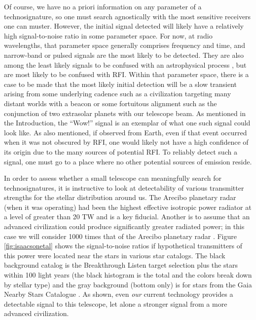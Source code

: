 Of course, we have no a priori information on any parameter of a technosignature, so one must search agnostically with the most sensitive receivers one can muster.  However, the initial signal detected will likely have a relatively high signal-to-noise ratio in some parameter space. For now, at radio wavelengths, that parameter space generally comprises frequency and time, and narrow-band or pulsed signals are the most likely to be detected.  They are also among the least likely signals to be confused with an astrophysical process \citep{Hippke_2017}, but are most likely to be confused with RFI. Within that parameter space, there is a case to be made that the most likely initial detection will be a slow transient arising from some underlying cadence such as a civilization targeting many distant worlds with a beacon or some fortuitous alignment such as the conjunction of two extrasolar planets with our telescope beam.  As mentioned in the Introduction, the ``Wow!'' signal is an exemplar of what one such signal could look like.  As also mentioned, if observed from Earth, even if that event occurred when it was not obscured by RFI, one would likely not have a high confidence of its origin due to the many sources of potential RFI. To reliably detect such a signal, one must go to a place where no other potential sources of emission reside.

In order to assess whether a small telescope can meaningfully search for technosignatures, it is instructive to look at detectability of various transmitter strengths for the stellar distribution around us. The Arecibo planetary radar (when it was operating) had been the highest effective isotropic power radiator at a level of greater than 20 TW and is a key fiducial. Another is to assume that an advanced civilization could produce significantly greater radiated power; in this case we will consider 1000 times that of the Arecibo planetary radar \citep{Gray_2020}.  Figure \ref{fig:isaacsonetal} shows the signal-to-noise ratios if hypothetical transmitters of this power were located near the stars in various star catalogs.  The black background catalog is the Breakthrough Listen target selection \citep{2017PASP..129e4501I} plus the stars within 100 light years (the black histogram is the total and the colors break down by stellar type) and the gray background (bottom only) is for stars from the Gaia Nearby Stars Catalogue \citep{2021A&A...649A...6G}. As shown, even {\em our} current technology provides a detectable signal to this telescope, let alone a stronger signal from a more advanced civilization.

